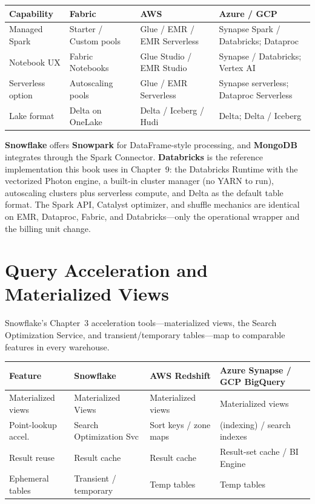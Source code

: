 \begin{center}
\footnotesize
\begin{tabular}{@{}p{2.8cm}p{3.2cm}p{3.2cm}p{3.2cm}@{}}
\toprule
\textbf{Capability} & \textbf{Fabric} & \textbf{AWS} & \textbf{Azure / GCP} \\
\midrule
Managed Spark & Starter / Custom pools & Glue / EMR / EMR Serverless & Synapse Spark / Databricks; Dataproc \\
Notebook UX & Fabric Notebooks & Glue Studio / EMR Studio & Synapse / Databricks; Vertex AI \\
Serverless option & Autoscaling pools & Glue / EMR Serverless & Synapse serverless; Dataproc Serverless \\
Lake format & Delta on OneLake & Delta / Iceberg / Hudi & Delta; Delta / Iceberg \\
\bottomrule
\end{tabular}
\end{center}

\noindent \textbf{Snowflake} offers \textbf{Snowpark} for DataFrame-style processing, and
\textbf{MongoDB} integrates through the Spark Connector. \textbf{Databricks} is the reference
implementation this book uses in Chapter~9: the Databricks Runtime with the vectorized Photon
engine, a built-in cluster manager (no YARN to run), autoscaling clusters plus serverless
compute, and Delta as the default table format. The Spark API, Catalyst optimizer, and shuffle
mechanics are identical on EMR, Dataproc, Fabric, and Databricks---only the operational wrapper
and the billing unit change.

\section{Query Acceleration and Materialized Views}
%
Snowflake's Chapter~3 acceleration tools---materialized views, the Search Optimization Service, and
transient/temporary tables---map to comparable features in every warehouse.

\begin{center}
\footnotesize
\begin{tabular}{@{}p{2.8cm}p{3.0cm}p{3.0cm}p{3.4cm}@{}}
\toprule
\textbf{Feature} & \textbf{Snowflake} & \textbf{AWS Redshift} & \textbf{Azure Synapse / GCP BigQuery} \\
\midrule
Materialized views & Materialized Views & Materialized views & Materialized views \\
Point-lookup accel. & Search Optimization Svc & Sort keys / zone maps & (indexing) / search indexes \\
Result reuse & Result cache & Result cache & Result-set cache / BI Engine \\
Ephemeral tables & Transient / temporary & Temp tables & Temp tables \\
\bottomrule
\end{tabular}
\end{center}

